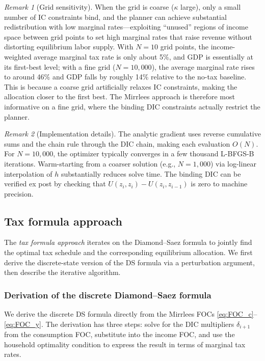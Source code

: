 \documentclass[12pt,a4paper]{article}
\theoremstyle{definition}
\theoremstyle{plain}
\theoremstyle{remark}
\newtheorem{remark}{Remark}[section]
\begin{document}
\begin{remark}[Grid sensitivity]
When the grid is coarse ($\kappa$ large), only a small number of IC constraints bind, and the planner can achieve substantial redistribution with low marginal rates---exploiting ``unused'' regions of income space between grid points to set high marginal rates that raise revenue without distorting equilibrium labor supply. With $N = 10$ grid points, the income-weighted average marginal tax rate is only about 5\%, and GDP is essentially at its first-best level; with a fine grid ($N = 10{,}000$), the average marginal rate rises to around 46\% and GDP falls by roughly 14\% relative to the no-tax baseline. This is because a coarse grid artificially relaxes IC constraints, making the allocation closer to the first best.  The Mirrlees approach is therefore most informative on a fine grid, where the binding DIC constraints actually restrict the planner.
\end{remark}

\begin{remark}[Implementation details]
The analytic gradient uses reverse cumulative sums and the chain rule through the DIC chain, making each evaluation $O(N)$. For $N = 10{,}000$, the optimizer typically converges in a few thousand L-BFGS-B iterations. Warm-starting from a coarser solution (e.g., $N = 1{,}000$) via log-linear interpolation of $h$ substantially reduces solve time. The binding DIC can be verified ex post by checking that $U(z_i, z_i) - U(z_i, z_{i-1})$ is zero to machine precision.
\end{remark}


\subsection{Tax formula approach}
\label{sec:tax_formula_approach}

The \emph{tax formula approach} iterates on the Diamond--Saez formula to jointly find the optimal tax schedule and the corresponding equilibrium allocation. We first derive the discrete-state version of the DS formula via a perturbation argument, then describe the iterative algorithm.

\subsubsection{Derivation of the discrete Diamond--Saez formula}

We derive the discrete DS formula directly from the Mirrlees FOCs \eqref{eq:FOC_c}--\eqref{eq:FOC_y}. The derivation has three steps: solve for the DIC multipliers $\delta_{i+1}$ from the consumption FOC, substitute into the income FOC, and use the household optimality condition to express the result in terms of marginal tax rates.
\end{document}
